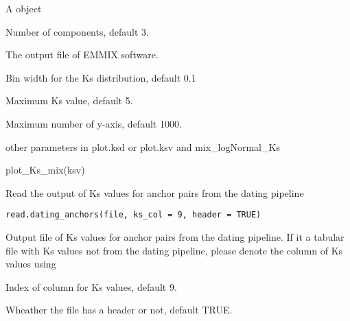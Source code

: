\documentclass[a4paper]{book}
\begin{document}
\begin{Arguments}
\begin{ldescription}
\item[\code{ksv}] A  object

\item[\code{ncomponent}] Number of components, default 3.

\item[\code{EMMIX.file}] The output file of EMMIX software.

\item[\code{bin\_width}] Bin width for the Ks distribution, default 0.1

\item[\code{maxK}] Maximum Ks value, default 5.

\item[\code{maxY}] Maximum number of y-axis, default 1000.

\item[\code{...}] other parameters in plot.ksd or plot.ksv and mix\_logNormal\_Ks
\end{ldescription}
\end{Arguments}
%
\begin{Examples}
\begin{ExampleCode}
plot_Ks_mix(ksv)
\end{ExampleCode}
\end{Examples}
%
\begin{Description}\relax
Read the output of Ks values for anchor pairs from the dating pipeline
\end{Description}
%
\begin{Usage}
\begin{verbatim}
read.dating_anchors(file, ks_col = 9, header = TRUE)
\end{verbatim}
\end{Usage}
%
\begin{Arguments}
\begin{ldescription}
\item[\code{file}] Output file of Ks values for anchor pairs from the dating
pipeline. If it a tabular file with Ks values not from the dating pipeline,
please denote the column of Ks values using 

\item[\code{ks\_col}] Index of column for Ks values, default 9.

\item[\code{header}] Wheather the file has a header or not, default TRUE.
\end{ldescription}
\end{Arguments}
\end{document}
